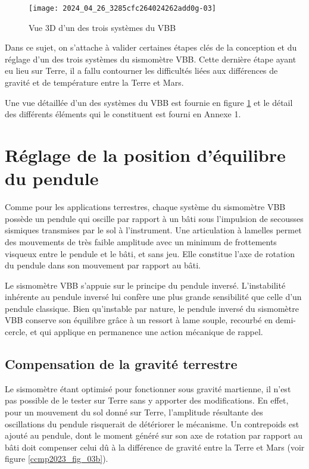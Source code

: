 \begin{figure}[!h]
\centering
\texttt{[image: 2024\_04\_26\_3285cfc264024262add0g-03]}
\caption{\label{ccmp2023_fig_02} Vue 3D d'un des trois systèmes du VBB}
\end{figure}



Dans ce sujet, on s'attache à valider certaines étapes clés de la conception et du réglage d'un des trois systèmes du sismomètre VBB. Cette dernière étape ayant eu lieu sur Terre, il a fallu contourner les difficultés liées aux différences de gravité et de température entre la Terre et Mars.

Une vue détaillée d'un des systèmes du VBB est fournie en figure \ref{ccmp2023_fig_02} et le détail des différents éléments qui le constituent est fourni en Annexe 1.

\section{Réglage de la position d'équilibre du pendule \label{ccmp2023_sec_02}}
Comme pour les applications terrestres, chaque système du sismomètre VBB possède un pendule qui oscille par rapport à un bâti sous l'impulsion de secousses sismiques transmises par le sol à l'instrument. Une articulation à lamelles permet des mouvements de très faible amplitude avec un minimum de frottements visqueux entre le pendule et le bâti, et sans jeu. Elle constitue l'axe de rotation du pendule dans son mouvement par rapport au bâti.

Le sismomètre VBB s'appuie sur le principe du pendule inversé. L'instabilité inhérente au pendule inversé lui confère une plus grande sensibilité que celle d'un pendule classique. Bien qu'instable par nature, le pendule inversé du sismomètre VBB conserve son équilibre grâce à un ressort à lame souple, recourbé en demi-cercle, et qui applique en permanence une action mécanique de rappel.

\subsection{Compensation de la gravité terrestre \label{ccmp2023_sec_02_01}}
Le sismomètre étant optimisé pour fonctionner sous gravité martienne, il n'est pas possible de le tester sur Terre sans y apporter des modifications. En effet, pour un mouvement du sol donné sur Terre, l'amplitude résultante des oscillations du pendule risquerait de détériorer le mécanisme. Un contrepoids est ajouté au pendule, dont le moment généré sur son axe de rotation par rapport au bâti doit compenser celui dû à la différence de gravité entre la Terre et Mars (voir figure \ref{ccmp2023_fig_03b}).




